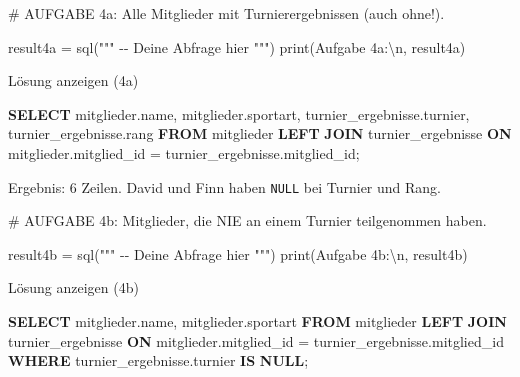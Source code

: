 \documentclass[
  nswissgerman,
  a4paper,
  DIV=11,
  numbers=noendperiod,
  ngerman]{scrreprt}
\newenvironment{Shaded}{\begin{snugshade}}{\end{snugshade}}
\newcommand{\BuiltInTok}[1]{\textcolor[rgb]{0.00,0.23,0.31}{#1}}
\newcommand{\CharTok}[1]{\textcolor[rgb]{0.13,0.47,0.30}{#1}}
\newcommand{\CommentTok}[1]{\textcolor[rgb]{0.37,0.37,0.37}{#1}}
\newcommand{\KeywordTok}[1]{\textcolor[rgb]{0.00,0.23,0.31}{\textbf{#1}}}
\newcommand{\NormalTok}[1]{\textcolor[rgb]{0.00,0.23,0.31}{#1}}
\newcommand{\OperatorTok}[1]{\textcolor[rgb]{0.37,0.37,0.37}{#1}}
\newcommand{\StringTok}[1]{\textcolor[rgb]{0.13,0.47,0.30}{#1}}
\begin{document}
\begin{Shaded}
\begin{Highlighting}[numbers=left,,]
\CommentTok{\# AUFGABE 4a: Alle Mitglieder mit Turnierergebnissen (auch ohne!).}

\NormalTok{result4a }\OperatorTok{=}\NormalTok{ sql(}\StringTok{"""}
\StringTok{{-}{-} Deine Abfrage hier}
\StringTok{"""}\NormalTok{)}
\BuiltInTok{print}\NormalTok{(}\StringTok{\textquotesingle{}Aufgabe 4a:}\CharTok{\textbackslash{}n}\StringTok{\textquotesingle{}}\NormalTok{, result4a)}
\end{Highlighting}
\end{Shaded}

Lösung anzeigen (4a)

\begin{Shaded}
\begin{Highlighting}[numbers=left,,]
\KeywordTok{SELECT}\NormalTok{ mitglieder.name, mitglieder.sportart,}
\NormalTok{       turnier\_ergebnisse.turnier, turnier\_ergebnisse.rang}
\KeywordTok{FROM}\NormalTok{ mitglieder}
\KeywordTok{LEFT} \KeywordTok{JOIN}\NormalTok{ turnier\_ergebnisse}
  \KeywordTok{ON}\NormalTok{ mitglieder.mitglied\_id }\OperatorTok{=}\NormalTok{ turnier\_ergebnisse.mitglied\_id;}
\end{Highlighting}
\end{Shaded}

Ergebnis: 6 Zeilen. David und Finn haben \texttt{NULL} bei Turnier und
Rang.

\begin{Shaded}
\begin{Highlighting}[numbers=left,,]
\CommentTok{\# AUFGABE 4b: Mitglieder, die NIE an einem Turnier teilgenommen haben.}

\NormalTok{result4b }\OperatorTok{=}\NormalTok{ sql(}\StringTok{"""}
\StringTok{{-}{-} Deine Abfrage hier}
\StringTok{"""}\NormalTok{)}
\BuiltInTok{print}\NormalTok{(}\StringTok{\textquotesingle{}Aufgabe 4b:}\CharTok{\textbackslash{}n}\StringTok{\textquotesingle{}}\NormalTok{, result4b)}
\end{Highlighting}
\end{Shaded}

Lösung anzeigen (4b)

\begin{Shaded}
\begin{Highlighting}[numbers=left,,]
\KeywordTok{SELECT}\NormalTok{ mitglieder.name, mitglieder.sportart}
\KeywordTok{FROM}\NormalTok{ mitglieder}
\KeywordTok{LEFT} \KeywordTok{JOIN}\NormalTok{ turnier\_ergebnisse}
  \KeywordTok{ON}\NormalTok{ mitglieder.mitglied\_id }\OperatorTok{=}\NormalTok{ turnier\_ergebnisse.mitglied\_id}
\KeywordTok{WHERE}\NormalTok{ turnier\_ergebnisse.turnier }\KeywordTok{IS} \KeywordTok{NULL}\NormalTok{;}
\end{Highlighting}
\end{Shaded}
\end{document}
